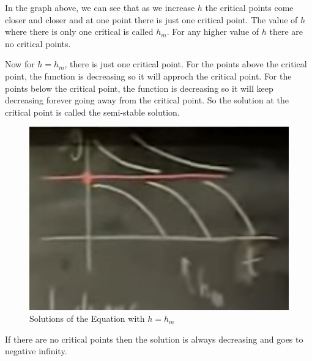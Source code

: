 In the graph above, we can see that as we increase $h$ the critical points come closer and closer and at one point there is just one critical point.
The value of $h$ where there is only one critical is called $h_m$.
For any higher value of $h$ there are no critical points.


Now for $h = h_m$, there is just one critical point.
For the points above the critical point, the function is decreasing so it will approch the critical point.
For the points below the critical point, the function is decreasing so it will keep decreasing forever going away from the critical point.
So the solution at the critical point is called the semi-stable solution.

\begin{figure}[ht!]
	\centering
	\includegraphics[scale=0.3]{./images/lecture_5_figure_5.png}
	\caption{Solutions of the Equation with $h = h_m$}
\end{figure}

If there are no critical points then the solution is always decreasing and goes to negative infinity.
